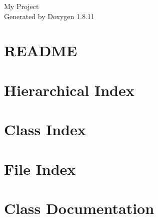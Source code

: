 \documentclass[twoside]{book}
\newcommand{\+}{\discretionary{\mbox{\scriptsize$\hookleftarrow$}}{}{}}
\newcommand{\clearemptydoublepage}{%
  \newpage{\pagestyle{empty}\cleardoublepage}%
}
\begin{document}
\hypersetup{pageanchor=false,
             bookmarksnumbered=true,
             pdfencoding=unicode
            }
\begin{titlepage}
\vspace*{7cm}
\begin{center}%
{\Large My Project }\\
\vspace*{1cm}
{\large Generated by Doxygen 1.8.11}\\
\end{center}
\end{titlepage}
\clearemptydoublepage
\tableofcontents
\clearemptydoublepage
{}
\hypersetup{pageanchor=true}

\chapter{R\+E\+A\+D\+ME}
\label{md_README}
\hypertarget{md_README}{}

\chapter{Hierarchical Index}

\chapter{Class Index}

\chapter{File Index}

\chapter{Class Documentation}

















































\end{document}

